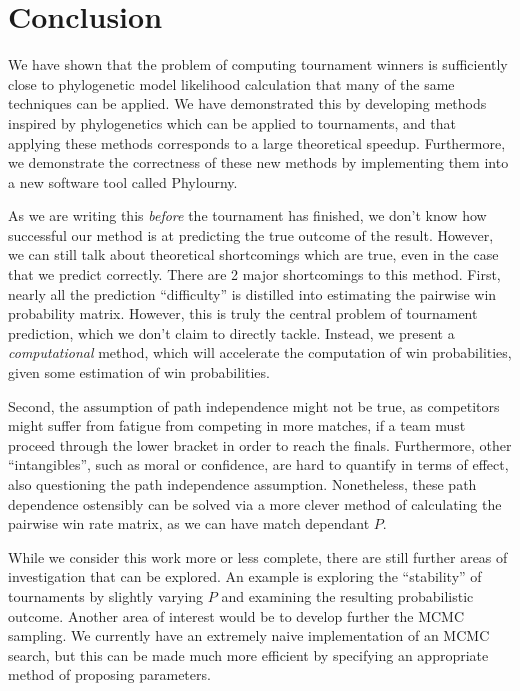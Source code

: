 \documentclass{article}
\begin{document}
\section{Conclusion}

We have shown that the problem of computing tournament winners is sufficiently close to phylogenetic model likelihood
calculation that many of the same techniques can be applied. We have demonstrated this by developing methods inspired by
phylogenetics which can be applied to tournaments, and that applying these methods corresponds to a large theoretical
speedup. Furthermore, we demonstrate the correctness of these new methods by implementing them into a new software tool
called Phylourny.

As we are writing this \textit{before} the tournament has finished, we don't know how successful our method is at
predicting the true outcome of the result. However, we can still talk about theoretical shortcomings which are true,
even in the case that we predict correctly. There are 2 major shortcomings to this method. First, nearly all the
prediction ``difficulty'' is distilled into estimating the pairwise win probability matrix. However, this is truly the
central problem of tournament prediction, which we don't claim to directly tackle. Instead, we present a
\textit{computational} method, which will accelerate the computation of win probabilities, given some estimation of win
probabilities.

Second, the assumption of path independence might not be true, as competitors might suffer from fatigue from competing
in more matches, if a team must proceed through the lower bracket in order to reach the finals. Furthermore, other
``intangibles'', such as moral or confidence, are hard to quantify in terms of effect, also questioning the path
independence assumption. Nonetheless, these path dependence ostensibly can be solved via a more clever method of
calculating the pairwise win rate matrix, as we can have match dependant $P$. 

While we consider this work more or less complete, there are still further areas of investigation that can be explored.
An example is exploring the ``stability'' of tournaments by slightly varying $P$ and examining the resulting
probabilistic outcome. Another area of interest would be to develop further the MCMC sampling. We currently have an
extremely naive implementation of an MCMC search, but this can be made much more efficient by specifying an appropriate
method of proposing parameters.



\end{document}
